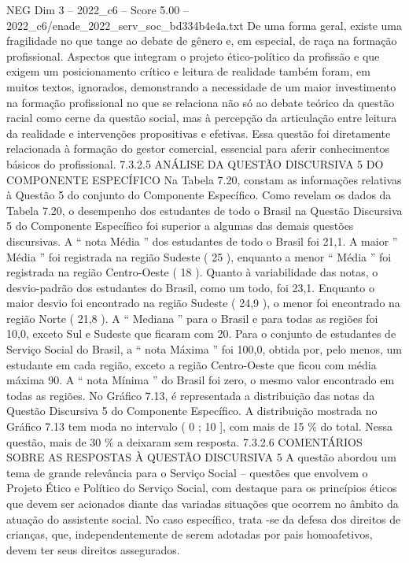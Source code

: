 \begin{textsample}{NEG Dim 3 – 2022\_c6 – Score 5.00 – 2022\_c6/enade\_2022\_serv\_soc\_bd334b4e4a.txt}
De uma forma geral, existe uma fragilidade no que tange ao debate de gênero e, em especial, de raça na formação profissional.
Aspectos que integram o projeto ético-político da profissão e que exigem um posicionamento crítico e leitura de realidade também foram, em muitos textos, ignorados, demonstrando a necessidade de um maior investimento na formação profissional no que se relaciona não só ao debate teórico da questão racial como cerne da questão social, mas à percepção da articulação entre leitura da realidade e intervenções propositivas e efetivas.
Essa questão foi diretamente relacionada à formação do gestor comercial, essencial para aferir conhecimentos básicos do profissional. 7.3.2.5 ANÁLISE DA QUESTÃO DISCURSIVA 5 DO COMPONENTE ESPECÍFICO Na Tabela 7.20, constam as informações relativas à Questão 5 do conjunto do Componente Específico.
Como revelam os dados da Tabela 7.20, o desempenho dos estudantes de todo o Brasil na Questão Discursiva 5 do Componente Específico foi superior a algumas das demais questões discursivas.
A “ nota Média ” dos estudantes de todo o Brasil foi 21,1.
A maior ” Média ” foi registrada na região Sudeste ( 25 ), enquanto a menor “ Média ” foi registrada na região Centro-Oeste ( 18 ).
Quanto à variabilidade das notas, o desvio-padrão dos estudantes do Brasil, como um todo, foi 23,1.
Enquanto o maior desvio foi encontrado na região Sudeste ( 24,9 ), o menor foi encontrado na região Norte ( 21,8 ).
A “ Mediana ” para o Brasil e para todas as regiões foi 10,0, exceto Sul e Sudeste que ficaram com 20.
Para o conjunto de estudantes de Serviço Social do Brasil, a “ nota Máxima ” foi 100,0, obtida por, pelo menos, um estudante em cada região, exceto a região Centro-Oeste que ficou com média máxima 90.
A “ nota Mínima ” do Brasil foi zero, o mesmo valor encontrado em todas as regiões.
No Gráfico 7.13, é representada a distribuição das notas da Questão Discursiva 5 do Componente Específico.
A distribuição mostrada no Gráfico 7.13 tem moda no intervalo ( 0 ; 10 ], com mais de 15 \% do total.
Nessa questão, mais de 30 \% a deixaram sem resposta. 7.3.2.6 COMENTÁRIOS SOBRE AS RESPOSTAS À QUESTÃO DISCURSIVA 5 A questão abordou um tema de grande relevância para o Serviço Social – questões que envolvem o Projeto Ético e Político do Serviço Social, com destaque para os princípios éticos que devem ser acionados diante das variadas situações que ocorrem no âmbito da atuação do assistente social.
No caso específico, trata -se da defesa dos direitos de crianças, que, independentemente de serem adotadas por pais homoafetivos, devem ter seus direitos assegurados.

\end{textsample}
